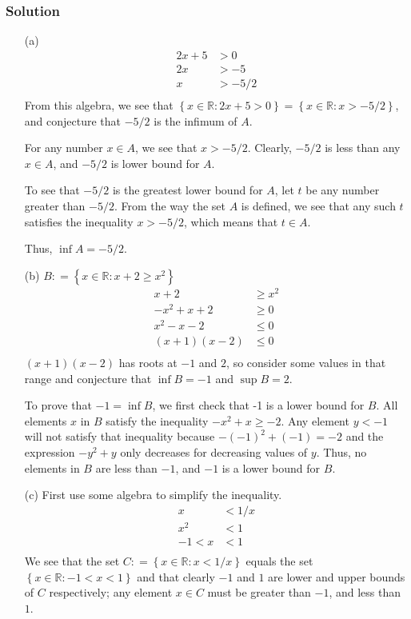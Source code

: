 \documentclass[12pt]{article}
\begin{document}
\subsubsection*{Solution}
\begin{itemize}
\item[(a)]
\begin{align*}
2x + 5 &> 0\\
2x &> -5\\
x &> -5/2\\
\end{align*}
From this algebra, we see that $\left\{x \in \mathbb{R} : 2x + 5 > 0\right\} = \left\{x \in \mathbb{R} : x > -5/2\right\}$, and conjecture that $-5/2$ is the infimum of $A$.

For any number $x \in A$, we see that $x > -5/2$. Clearly, $-5/2$ is less than any $x \in A$, and $-5/2$ is lower bound for $A$.

To see that $-5/2$ is the greatest lower bound for $A$, let $t$ be any number greater than $-5/2$. From the way the set $A$ is defined, we see that any such $t$ satisfies the inequality $x > -5/2$, which means that $t \in A$.

Thus, $\inf A = -5/2$.
\item[(b)]
$B \mathrel{\mathop:}= \left\{x \in \mathbb{R} : x + 2 \geq x^2\right\}$
\begin{align*}
x + 2 &\geq x^2 \\
-x^2 + x + 2 &\geq 0 \\
x^2 - x - 2 &\leq 0 \\
\left(x + 1\right)\left(x - 2\right) &\leq 0 \\
\end{align*}
$\left(x + 1\right)\left(x - 2\right)$ has roots at $-1$ and $2$, so consider some values in that range and conjecture that $\inf B = -1$ and $\sup B = 2$.

To prove that $-1 = \inf B$, we first check that -1 is a lower bound for $B$. All elements $x$ in $B$ satisfy the inequality $-x^2 + x \geq -2$. Any element $y < -1$ will not satisfy that inequality because $-\left(-1\right)^2 + \left(-1\right) = -2$ and the expression $-y^2 + y$ only decreases for decreasing values of $y$. Thus, no elements in $B$ are less than $-1$, and $-1$ is a lower bound for $B$.
\item[(c)]
First use some algebra to simplify the inequality.
\begin{align*}
x &< 1 / x\\
x^2 &< 1\\
-1 < x &< 1\\
\end{align*}
We see that the set $C \mathrel{\mathop:}= \left\{x \in \mathbb{R} : x < 1/x\right\}$ equals the set $\left\{x \in \mathbb{R} : -1 < x < 1\right\}$ and that clearly $-1$ and $1$ are lower and upper bounds of $C$ respectively; any element $x \in C$ must be greater than $-1$, and less than $1$.


\end{itemize}
\end{document}
